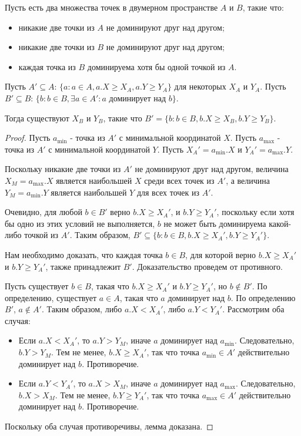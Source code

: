 \begin{lemma}
\label{contiguous-dominate-contiguous}
Пусть есть два множества точек в двумерном пространстве $A$ и $B$, такие что:
\begin{itemize}
	\item никакие две точки из $A$ не доминируют друг над другом;
	\item никакие две точки из $B$ не доминируют друг над другом;
	\item каждая точка из $B$ доминируема хотя бы одной точкой из $A$.
\end{itemize}

Пусть $A' \subseteq A$: $\{ a : a \in A, a.X \ge X_A, a.Y \ge Y_A\}$ для некоторых $X_A$ и $Y_A$.
Пусть $B' \subseteq B$: $\{ b : b \in B, \exists a \in A' : a \mbox{ доминирует над } b \}$.

Тогда существуют $X_B$ и $Y_B$, такие что $B' = \{ b : b \in B, b.X \ge X_B, b.Y \ge Y_B\}$.
\end{lemma}

\begin{proof}
Пусть $a_{\min}$ - точка из $A'$ с минимальной координатой $X$.
Пусть $a_{\max}$ - точка из $A'$ с минимальной координатой $Y$.
Пусть $X_A' = a_{\min}.X$ и $Y_A' = a_{\max}.Y$.

Поскольку никакие две точки из $A'$ не доминируют друг над другом, величина $X_M = a_{\max}.X$ 
является наибольшей $X$ среди всех точек из $A'$, а величина $Y_M = a_{\min}.Y$ является
наибольшей $Y$ для всех точек из $A'$.

Очевидно, для любой $b \in B'$ верно $b.X \ge X_A'$, и $b.Y \ge Y_A'$, 
поскольку если хотя бы одно из этих условий не выполняется, $b$ не может быть доминируема какой-либо
точкой из $A'$. Таким образом, $B' \subseteq \{ b : b \in B, b.X \ge X_A', b.Y \ge Y_A'\}$.

Нам необходимо доказать, что каждая точка $b \in B$, для которой верно $b.X \ge X_A'$ и $b.Y \ge Y_A'$, 
также принадлежит $B'$. Доказательство проведем от противного.

Пусть существует $b \in B$, такая что $b.X \ge X_A'$ и $b.Y \ge Y_A'$, но $b \not\in B'$.
По определению, существует $a \in A$, такая что $a$ доминирует над $b$. По определению $B'$, 
$a \notin A'$. Таким образом, либо $a.X < X_A'$, либо $a.Y < Y_A'$.
Рассмотрим оба случая:
\begin{itemize}
    \item Если $a.X < X_A'$, то $a.Y > Y_M$, иначе $a$ доминирует над $a_{\min}$. 
          Следовательно, $b.Y > Y_M$. Тем не менее, $b.X \ge X_A'$, так что
          точка $a_{\min} \in A'$ действительно доминирует над $b$. Противоречие.
    \item Если $a.Y < Y_A'$, то $a.X > X_M$, иначе $a$ доминирует над $a_{\max}$. 
          Следовательно, $b.X > X_M$. Тем не менее, $b.Y \ge Y_A'$, так что
          точка $a_{\max} \in A'$ действительно доминирует над $b$. Противоречие.
\end{itemize}
Поскольку оба случая противоречивы, лемма доказана.
\end{proof}

